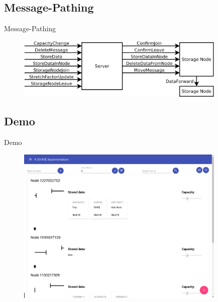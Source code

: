 \documentclass{beamer}
\begin{document}
	\subsection{Message-Pathing}
	\begin{frame}{Message-Pathing}
		\begin{figure}
			\raggedright
			\begin{minipage}{1cm}
				\includegraphics[width=10cm]{messages.png}
			\end{minipage}
		\end{figure}
	\end{frame}
	\subsection{Demo}
	\begin{frame}{Demo}
		\begin{figure}
			\raggedright
			\begin{minipage}{1cm}
				\includegraphics[width=10cm]{app.png}
			\end{minipage}
		\end{figure}
	\end{frame}
\end{document}
